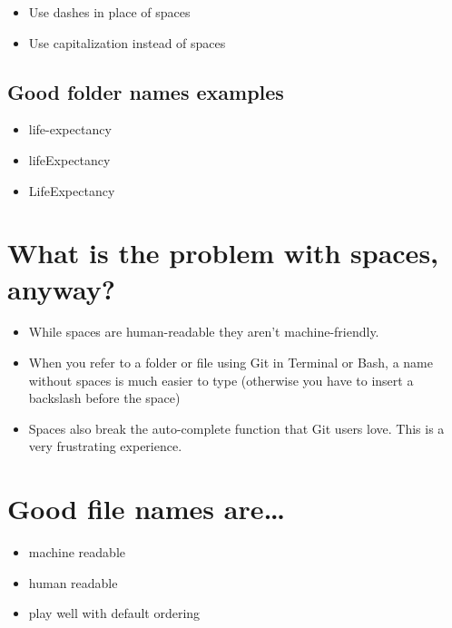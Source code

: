 \documentclass[
]{book}
\providecommand{\tightlist}{%
  \setlength{\itemsep}{0pt}\setlength{\parskip}{0pt}}
\begin{document}
\begin{itemize}
\tightlist
\item
  Use dashes in place of spaces
\item
  Use capitalization instead of spaces
\end{itemize}

\hypertarget{good-folder-names-examples}{%
\subsection{Good folder names examples}\label{good-folder-names-examples}}

\begin{itemize}
\tightlist
\item
  life-expectancy
\item
  lifeExpectancy
\item
  LifeExpectancy
\end{itemize}

\hypertarget{what-is-the-problem-with-spaces-anyway}{%
\section{What is the problem with spaces, anyway?}\label{what-is-the-problem-with-spaces-anyway}}

\begin{itemize}
\tightlist
\item
  While spaces are human-readable they aren't machine-friendly.
\item
  When you refer to a folder or file using Git in Terminal or Bash, a name
  without spaces is much easier to type (otherwise you have to insert a
  backslash before the space)
\item
  Spaces also break the auto-complete function that Git users love. This is a
  very frustrating experience.
\end{itemize}

\hypertarget{good-file-names-are}{%
\section{Good file names are\ldots{}}\label{good-file-names-are}}

\begin{itemize}
\tightlist
\item
  machine readable
\item
  human readable
\item
  play well with default ordering
\end{itemize}
\end{document}
